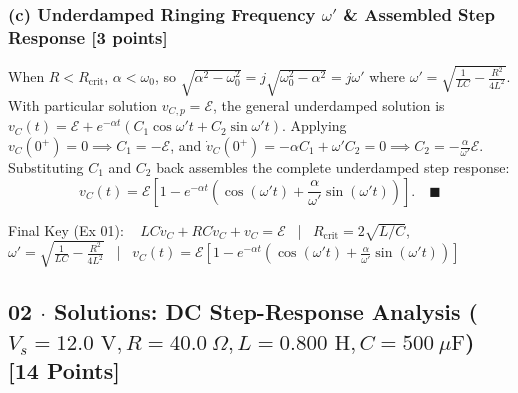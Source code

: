 \documentclass[10pt,letterpaper]{article}
\begin{document}
{  \subsubsection*{(c) Underdamped Ringing Frequency $\omega'$ \& Assembled Step Response [3 points]}
  When $R < R_{\text{crit}}$, $\alpha < \omega_0$, so $\sqrt{\alpha^2 - \omega_0^2} = j\sqrt{\omega_0^2 - \alpha^2} = j\omega'$ where $\omega' = \sqrt{\frac{1}{LC} - \frac{R^2}{4L^2}}$. With particular solution $v_{C,p} = \mathcal{E}$, the general underdamped solution is $v_C(t) = \mathcal{E} + e^{-\alpha t}(C_1\cos\omega' t + C_2\sin\omega' t)$. Applying $v_C(0^+)=0 \implies C_1 = -\mathcal{E}$, and $\dot{v}_C(0^+) = -\alpha C_1 + \omega' C_2 = 0 \implies C_2 = -\frac{\alpha}{\omega'}\mathcal{E}$. Substituting $C_1$ and $C_2$ back assembles the complete underdamped step response:
  $$v_C(t) = \mathcal{E}\left[1 - e^{-\alpha t}\left(\cos(\omega' t) + \frac{\alpha}{\omega'}\sin(\omega' t)\right)\right]. \quad \blacksquare$$

Final Key (Ex 01): ~ $LC\ddot{v}_C + RC\dot{v}_C + v_C = \mathcal{E}$ ~|~ $R_{\text{crit}} = 2\sqrt{L/C}$, ~ $\omega' = \sqrt{\frac{1}{LC} - \frac{R^2}{4L^2}}$ ~|~ $v_C(t) = \mathcal{E}\left[1 - e^{-\alpha t}\left(\cos(\omega' t) + \frac{\alpha}{\omega'}\sin(\omega' t)\right)\right]$


\newpage



\subsection*{02 $\cdot$ Solutions: DC Step-Response Analysis ($V_s=12.0\text{ V}, R=40.0\ \Omega, L=0.800\text{ H}, C=500\ \mu\text{F}$) \hfill [14 Points]}


}
\end{document}
